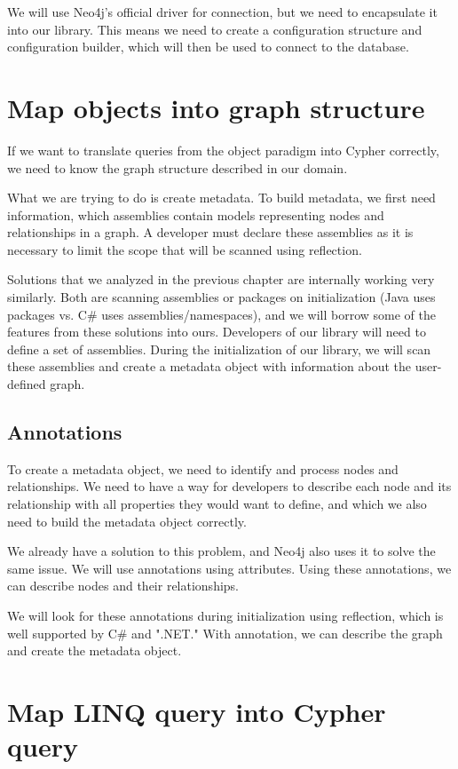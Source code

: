 We will use Neo4j's official driver for connection, but we need to encapsulate it into our library. This means we need to create a configuration structure and configuration builder, which will then be used to connect to the database.

\section {Map objects into graph structure}

If we want to translate queries from the object paradigm into Cypher correctly, we need to know the graph structure described in our domain.

What we are trying to do is create metadata. To build metadata, we first need information, which assemblies contain models representing nodes and relationships in a graph. A developer must declare these assemblies as it is necessary to limit the scope that will be scanned using reflection.

Solutions that we analyzed in the previous chapter are internally working very similarly. Both are scanning assemblies or packages on initialization (Java uses packages vs. C\# uses assemblies/namespaces), and we will borrow some of the features from these solutions into ours. Developers of our library will need to define a set of assemblies. During the initialization of our library, we will scan these assemblies and create a metadata object with information about the user-defined graph.

\subsection {Annotations}

To create a metadata object, we need to identify and process nodes and relationships. We need to have a way for developers to describe each node and its relationship with all properties they would want to define, and which we also need to build the metadata object correctly.

We already have a solution to this problem, and Neo4j also uses it to solve the same issue. We will use annotations using attributes. Using these annotations, we can describe nodes and their relationships.

We will look for these annotations during initialization using reflection, which is well supported by C\# and ".NET." With annotation, we can describe the graph and create the metadata object.

\section {Map LINQ query into Cypher query}


